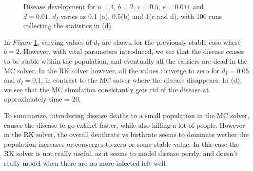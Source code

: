 \begin{figure}
    \caption{Disease development for $a=4$, $b=2$, $c=0.5$, $e=0.011$ and $d=0.01$. $d_I$ varies as 0.1 (a), 0.5(b) and 1(c and d), with 100 runs collecting the statistics in (d)}
    \label{fig:vitalb2}
\end{figure}

In \textit{Figure} \ref{fig:vitalb2}, varying values of $d_I$ are shown for the previously stable case where $b=2$. 
However, with vital parameters introduced, we see that the disease ceases to be stable within the population, and eventually all the carriers are dead in the MC solver.
In the RK solver however, all the values converge to zero for $d_I=0.05$ and $d_I=0.1$, in contrast to the MC solver where the disease disappears.
In (d), we see that the MC simulation consistantly gets rid of the disease at approximately time = 20. 

To summarize, introducing disease deaths to a small population in the MC solver, causes the disease to go extinct faster, while also killing a lot of people.
However in the RK solver, the overall deathrate vs birthrate seems to dominate wether the population increases or converges to zero or some stable value.
In this case the RK solver is not really useful, as it seems to model disease porrly, and doesn't really model when there are no more infected left well.


